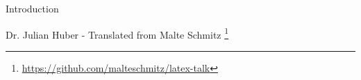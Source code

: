 
\begin{frame}
  \begin{center}
    \vskip1cm
    {\bfseries\color{maincolor}{\fontsize{72pt}{72pt}\selectfont\rmfamily\LaTeX}
    \par\vskip5mm
    \Huge Introduction}
    \par\vskip12mm
    \large Dr. Julian Huber - Translated from Malte Schmitz \footnote{\url{https://github.com/malteschmitz/latex-talk}}
  \end{center}
\end{frame}